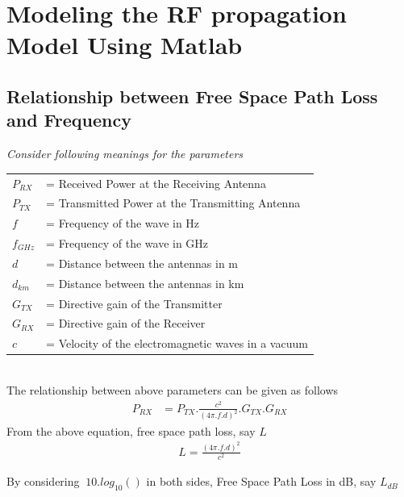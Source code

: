 \documentclass[a4paper,11pt]{article}%
\begin{document}

\tableofcontents
\pagebreak
\section{Modeling the RF propagation Model Using Matlab}
\subsection{Relationship between Free Space Path Loss and Frequency}

\textit{Consider  following meanings for the parameters}\\

\begin{tabular}{l l }
	$P_{RX}$ & = Received Power at the Receiving Antenna\\
	$P_{TX}$ & = Transmitted Power at the Transmitting Antenna\\
	$f$ & = Frequency of the wave in Hz\\
	$f_{GHz}$ & = Frequency of the wave in GHz\\
	$d$& = Distance between the antennas in m\\
	$d_{km}$& = Distance between the antennas in km\\
	$G_{TX}$& = Directive gain of the Transmitter\\
	$G_{RX}$& = Directive gain of the Receiver\\
	$c$& = Velocity of the electromagnetic waves in a vacuum\\

\end{tabular}\\[1cm]


The relationship between above parameters can be given as follows
\[
\begin{split}
P_{RX} & = P_{TX}.\frac{c^2}{(4\pi.f.d)^2}.G_{TX}.G_{RX}
\end{split}
\]
From the above equation, free space path loss, say $L$
\[
\begin{split}
L = \frac{(4\pi.f.d)^2}{c^2}
\end{split}
\]

By considering $\ 10.log_{10}()$ in both sides, Free Space Path Loss in dB, say $L_{dB}$
\end{document}
